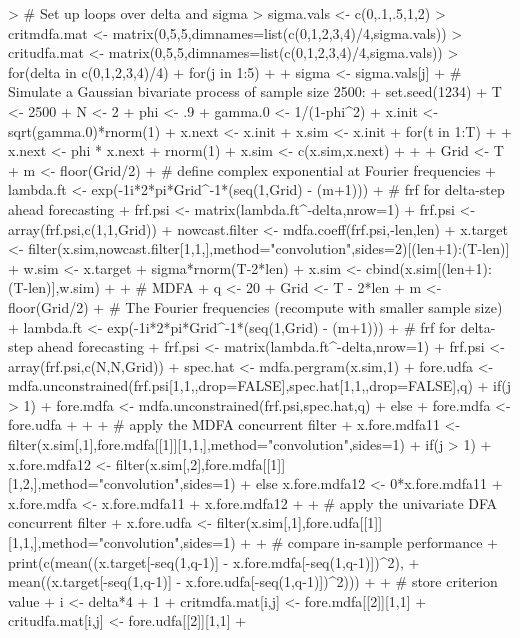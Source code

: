 \documentclass[a4paper]{book}
\begin{document}
\begin{Schunk}
\begin{Sinput}
> # Set up loops over delta and sigma
> sigma.vals <- c(0,.1,.5,1,2)
> critmdfa.mat <- matrix(0,5,5,dimnames=list(c(0,1,2,3,4)/4,sigma.vals))
> critudfa.mat <- matrix(0,5,5,dimnames=list(c(0,1,2,3,4)/4,sigma.vals))
> for(delta in c(0,1,2,3,4)/4) {
+ for(j in 1:5) {
+ 
+ sigma <- sigma.vals[j]
+ # Simulate a Gaussian bivariate process of sample size 2500:
+ set.seed(1234)
+ T <- 2500
+ N <- 2
+ phi <- .9
+ gamma.0 <- 1/(1-phi^2)
+ x.init <- sqrt(gamma.0)*rnorm(1)
+ x.next <- x.init
+ x.sim <- x.init
+ for(t in 1:T)
+ {
+ 	x.next <- phi * x.next + rnorm(1)
+ 	x.sim <- c(x.sim,x.next)
+ }
+ 
+ Grid <- T
+ m <- floor(Grid/2)
+ # define complex exponential at Fourier frequencies
+ lambda.ft <- exp(-1i*2*pi*Grid^{-1}*(seq(1,Grid) - (m+1)))
+ # frf for delta-step ahead forecasting
+ frf.psi <- matrix(lambda.ft^{-delta},nrow=1) 
+ frf.psi <- array(frf.psi,c(1,1,Grid))
+ nowcast.filter <- mdfa.coeff(frf.psi,-len,len)
+ x.target <- filter(x.sim,nowcast.filter[1,1,],method="convolution",sides=2)[(len+1):(T-len)]
+ w.sim <- x.target + sigma*rnorm(T-2*len)
+ x.sim <- cbind(x.sim[(len+1):(T-len)],w.sim)
+ 
+ # MDFA
+ q <- 20
+ Grid <- T - 2*len
+ m <- floor(Grid/2)
+ # The Fourier frequencies (recompute with smaller sample size)
+ lambda.ft <- exp(-1i*2*pi*Grid^{-1}*(seq(1,Grid) - (m+1)))
+ # frf for delta-step ahead forecasting
+ frf.psi <- matrix(lambda.ft^{-delta},nrow=1) %
+ frf.psi <- array(frf.psi,c(N,N,Grid))
+ spec.hat <- mdfa.pergram(x.sim,1)	
+ fore.udfa <- mdfa.unconstrained(frf.psi[1,1,,drop=FALSE],spec.hat[1,1,,drop=FALSE],q)
+ if(j > 1) { 
+ 	fore.mdfa <- mdfa.unconstrained(frf.psi,spec.hat,q) 
+ } else {
+ 	fore.mdfa <- fore.udfa 
+ }
+   
+ # apply the MDFA concurrent filter
+ x.fore.mdfa11 <- filter(x.sim[,1],fore.mdfa[[1]][1,1,],method="convolution",sides=1)
+ if(j > 1) { 
+ 	x.fore.mdfa12 <- filter(x.sim[,2],fore.mdfa[[1]][1,2,],method="convolution",sides=1) 
+ } else { x.fore.mdfa12 <- 0*x.fore.mdfa11 }
+ x.fore.mdfa <- x.fore.mdfa11 + x.fore.mdfa12 
+ 
+ # apply the univariate DFA concurrent filter
+ x.fore.udfa <- filter(x.sim[,1],fore.udfa[[1]][1,1,],method="convolution",sides=1)
+ 
+ # compare in-sample performance
+ print(c(mean((x.target[-seq(1,q-1)] - x.fore.mdfa[-seq(1,q-1)])^2),
+ 	mean((x.target[-seq(1,q-1)] - x.fore.udfa[-seq(1,q-1)])^2)))
+ 
+ # store criterion value
+ i <- delta*4 + 1
+ critmdfa.mat[i,j] <- fore.mdfa[[2]][1,1]
+ critudfa.mat[i,j] <- fore.udfa[[2]][1,1]
+ }}
\end{Sinput}

\end{Schunk}
\end{document}
